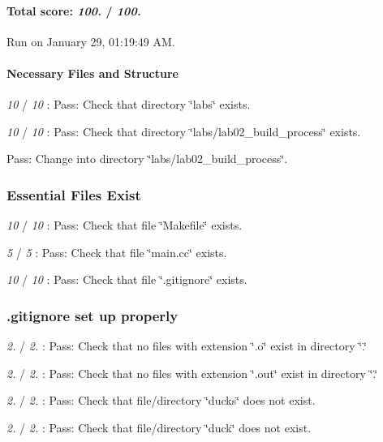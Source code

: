 \paragraph*{Total score\+: {\itshape 100.} / {\itshape 100.}}

Run on January 29, 01\+:19\+:49 AM.

\paragraph*{Necessary Files and Structure}


\begin{DoxyItemize}
\item {\itshape 10} / {\itshape 10} \+: Pass\+: Check that directory \char`\"{}labs\char`\"{} exists.
\item {\itshape 10} / {\itshape 10} \+: Pass\+: Check that directory \char`\"{}labs/lab02\+\_\+build\+\_\+process\char`\"{} exists.
\item Pass\+: Change into directory \char`\"{}labs/lab02\+\_\+build\+\_\+process\char`\"{}.
\end{DoxyItemize}

\subsubsection*{Essential Files Exist}


\begin{DoxyItemize}
\item {\itshape 10} / {\itshape 10} \+: Pass\+: Check that file \char`\"{}\+Makefile\char`\"{} exists.
\item {\itshape 5} / {\itshape 5} \+: Pass\+: Check that file \char`\"{}main.\+cc\char`\"{} exists.
\item {\itshape 10} / {\itshape 10} \+: Pass\+: Check that file \char`\"{}.\+gitignore\char`\"{} exists.
\end{DoxyItemize}

\subsubsection*{.gitignore set up properly}


\begin{DoxyItemize}
\item {\itshape 2.} / {\itshape 2.} \+: Pass\+: Check that no files with extension \char`\"{}.\+o\char`\"{} exist in directory \char`\"{}.\char`\"{}
\item {\itshape 2.} / {\itshape 2.} \+: Pass\+: Check that no files with extension \char`\"{}.\+out\char`\"{} exist in directory \char`\"{}.\char`\"{}
\item {\itshape 2.} / {\itshape 2.} \+: Pass\+: Check that file/directory \char`\"{}ducks\char`\"{} does not exist.
\item {\itshape 2.} / {\itshape 2.} \+: Pass\+: Check that file/directory \char`\"{}duck\char`\"{} does not exist.
\end{DoxyItemize}


